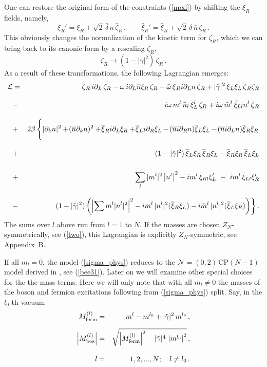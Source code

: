 \documentclass[epsfig,12pt]{article}
\def\beq{\begin{equation}}
\def\eeq{\end{equation}}
\def\beqn{\begin{eqnarray}}
\def\eeqn{\end{eqnarray}}
\newcommand{\nzt}{${\mathcal N}=(0,2)\,$}
\newcommand{\cpn}{CP$(N-1)\,$}
\newcommand{\cell}{{\mathcal L}}
\newcommand{\pt}{\partial}
\newcommand{\zn}{$Z_N$}
\def\beqn{\begin{eqnarray}}
\def\eeqn{\end{eqnarray}}
\def\beq{\begin{equation}}
\def\eeq{\end{equation}}
\newcommand{\p}{\partial}
\newcommand{\ov}{\overline}
\newcommand{\bxir}{\ov{\xi}{}_R}
\newcommand{\bxil}{\ov{\xi}{}_L}
\newcommand{\xir}{\xi_R}
\newcommand{\xil}{\xi_L}
\newcommand{\bzr}{\ov{\zeta}{}_R}
\newcommand{\zr}{\zeta_R}
\newcommand{\nbar}{\ov{n}}
\begin{document}
One can restore the original form of 
the constraints (\ref{npxi})  by   shifting  the $ \xir $ fields, namely,
\beq
\xi_R'= \xir + \sqrt{2}\, \bar{\delta}\, n\, \bar\zeta_R\,, \qquad
\bar\xi_R'= \bar\xi_R + \sqrt{2}\, {\delta}\, \bar{n}\, \zeta_R\,.
\label{wtpi7}
\eeq
This obviously changes the normalization of the kinetic term for $ \zr $, which we can
bring back to its canonic form by a rescaling $ \zr $,
\beq
	\zr  \to   ( 1 - |\gamma|^2 )\, \zr\,.
	\label{wtpi8}
\eeq
As a result of these transformations,  the following Lagrangian emerges:
\beqn
\cell 
&=&
 \bzr\, i\pt_L\, \zr
-\omega\, i\pt_L\nbar \xir\, \zr - \bar{\omega}\, \bxir i\p_L n\, \bzr
+ |\tilde\gamma|^2\, \bxil \xil\, \bzr \zr
	\nonumber\\[3mm]
	&-&
 i\omega\, m^l\, \bar{n}_l \, \xi_L^l\, \zr 
	+ i\omega\, \bar{m}^l\, \bar{\xi}_{Ll} n^l\, \bzr
\nonumber\\[3mm]
&+&
2\beta \left\{\rule{0mm}{6mm}
		| \pt_k n |^2  +\! (\nbar  \p_k n)^2 + \! \bxir i\p_L \xir +\! \bxil  i\p_R \xil
	-\!  (\nbar  i\p_R n)  \bxil \xil - \! (\nbar  i\p_L n) \bxir \xir
	\right.
\nonumber\\[3mm]
&+& (1-|\tilde\gamma|^2)\,\bxil\xir\,\bxir\xil - \bxir\xir\,\bxil\xil
	\nonumber\\[5mm]
&+&
  \sum_l |m^l|^2 \left|n^l \right|^2 
- i m^l\, \bar{\xi}_{Rl} \xi_L^l ~-~ i\bar{m}^l\, \bar{\xi}_{Ll} \xi_R^l
\nonumber\\[3mm]
&-&
\left.
 (1-|\tilde\gamma|^2)
	\left(
	 \left|\sum m^l |n^l|^2 \right|^2 
		- i m^l\, |n^l|^2 (\bxir\xil) - i\bar{m}^l\, |n^l|^2(\bxil\xir)
	\right) \right\}.
	\label{sigma_phys}
\eeqn
The sums over $l$ above run from $l=1$ to $N$. If the masses are chosen \zn-symmetrically, see
(\ref{two}), this Lagrangian is explicitly \zn-symmetric, see  Appendix~B.

If all $m_l=0$,  the model (\ref{sigma_phys}) reduces to the \nzt \cpn model
derived in \cite{SY1}, see (\ref{bee31}). 
Later on we will examine
other special choices for the  the mass terms. Here we will only note that
with all $m_l \neq 0$ the masses of the boson and fermion excitations following from
(\ref{sigma_phys}) split. Say, in the $l_0$-th vacuum
\beqn
M_{\rm ferm}^{(l)} 
&=&
 m^l - m^{l_0} + |\tilde\gamma|^2\,m^{l_0} \,,
	\nonumber\\[2mm]
	\left| M_{\rm bos}^{(l)} \right|
	&=&
	\sqrt{ \left| M^{(l)}_{\rm ferm} \right|^2 - |\tilde\gamma|^4\, \left| m^{l_0}\right|^2}
	\,,
	\nonumber\\[3mm]
	l
	&=&
	 1,2, ..., N;\quad l\neq l_0\,.
\eeqn
\end{document}
